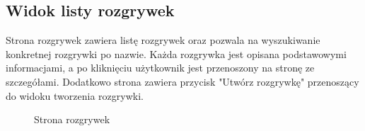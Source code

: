 \documentclass[shortabstract]{iithesis}
\begin{document}
\subsection{Widok listy rozgrywek}
Strona rozgrywek zawiera listę rozgrywek oraz pozwala na wyszukiwanie konkretnej rozgrywki po nazwie.
Każda rozgrywka jest opisana podstawowymi informacjami, a po kliknięciu użytkownik jest przenoszony na stronę ze szczegółami.
Dodatkowo strona zawiera przycisk "Utwórz rozgrywkę" przenoszący do widoku tworzenia rozgrywki.


\begin{figure}[H]
    \centering
    \hfill
    \caption{Strona rozgrywek}
\end{figure}
\end{document}

